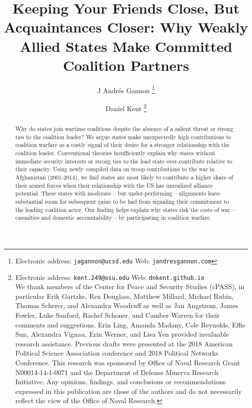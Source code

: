 \documentclass[12pt,letterpaper]{article}
\title{Keeping Your Friends Close, But Acquaintances Closer: Why Weakly Allied States Make Committed Coalition Partners}
\author{J Andr\'{e}s Gannon%
	\thanks{Electronic address: \texttt{jagannon@ucsd.edu} Web: \texttt{jandresgannon.com}}}
\affil{Department of Political Science \\ University of California, San Diego}
\author{Daniel Kent%
	\thanks{Electronic address: \texttt{kent.249@osu.edu} Web: \texttt{dnkent.github.io} \\ We thank members of the Center for Peace and Security Studies (cPASS), in particular Erik Gartzke, Rex Douglass, Matthew Millard, Michael Rubin, Thomas Scherer, and Alexandra Woodruff as well as Jan Angstrom, James Fowler, Luke Sanford, Rachel Schoner, and Camber Warren for their comments and suggestions. Erin Ling, Amanda Madany, Cole Reynolds, Effie Sun, Alexandra Vignau, Erin Werner, and Lisa Yen provided invaluable research assistance. Previous drafts were presented at the 2018 American Political Science Association conference and 2018 Political Networks Conference. This research was sponsored by Office of Naval Research Grant N00014-14-1-0071 and the Department of Defense Minerva Research Initiative. Any opinions, findings, and conclusions or recommendations expressed in this publication are those of the authors and do not necessarily reflect the view of the Office of Naval Research.}}
\affil{Department of Political Science \\ The Ohio State University}
\begin{document}
\maketitle

\begin{abstract}
	Why do states join wartime coalitions despite the absence of a salient threat or strong ties to the coalition leader? We argue states make unexpectedly high contributions to coalition warfare as a costly signal of their desire for a stronger relationship with the coalition leader. Conventional theories insufficiently explain why states without immediate security interests or strong ties to the lead state over-contribute relative to their capacity. Using newly compiled data on troop contributions to the war in Afghanistan (2001-2014), we find states are most likely to contribute a higher share of their armed forces when their relationship with the US has unrealized alliance potential. These states with moderate -- but under-performing -- alignments leave substantial room for subsequent gains to be had from signaling their commitment to the leading coalition actor. Our finding helps explain why states risk the costs of war -- casualties and domestic accountability -- by participating in coalition warfare.
\end{abstract}
\end{document}
